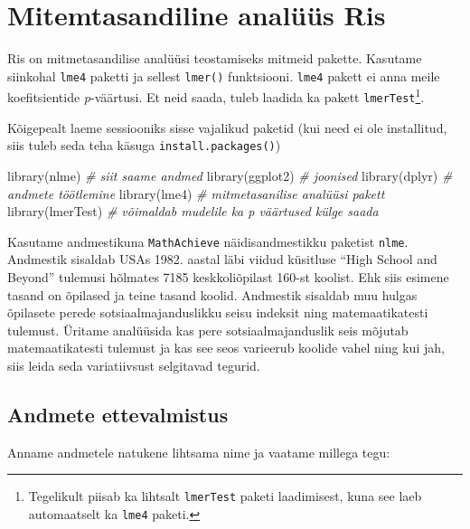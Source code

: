 \documentclass[
]{book}
\newenvironment{Shaded}{\begin{snugshade}}{\end{snugshade}}
\newcommand{\CommentTok}[1]{\textcolor[rgb]{0.56,0.35,0.01}{\textit{#1}}}
\newcommand{\FunctionTok}[1]{\textcolor[rgb]{0.00,0.00,0.00}{#1}}
\newcommand{\NormalTok}[1]{#1}
\begin{document}
\hypertarget{mitemtasandiline-analuxfcuxfcs-ris}{%
\section{Mitemtasandiline analüüs Ris}\label{mitemtasandiline-analuxfcuxfcs-ris}}

Ris on mitmetasandilise analüüsi teostamiseks mitmeid pakette. Kasutame siinkohal \texttt{lme4} paketti ja sellest \texttt{lmer()} funktsiooni. \texttt{lme4} pakett ei anna meile koefitsientide \emph{p}-väärtusi. Et neid saada, tuleb laadida ka pakett \texttt{lmerTest}\footnote{Tegelikult piisab ka lihtsalt \texttt{lmerTest} paketi laadimisest, kuna see laeb automaatselt ka \texttt{lme4} paketi.}.

Kõigepealt laeme sessiooniks sisse vajalikud paketid (kui need ei ole installitud, siis tuleb seda teha käsuga \texttt{install.packages()})

\begin{Shaded}
\begin{Highlighting}[]
\FunctionTok{library}\NormalTok{(nlme) }\CommentTok{\# siit saame andmed}
\FunctionTok{library}\NormalTok{(ggplot2) }\CommentTok{\# joonised}
\FunctionTok{library}\NormalTok{(dplyr) }\CommentTok{\# andmete töötlemine}
\FunctionTok{library}\NormalTok{(lme4) }\CommentTok{\# mitmetasanilise analüüsi pakett}
\FunctionTok{library}\NormalTok{(lmerTest) }\CommentTok{\# võimaldab mudelile ka p väärtused külge saada}
\end{Highlighting}
\end{Shaded}

Kasutame andmestikuna \texttt{MathAchieve} näidisandmestikku paketist \texttt{nlme}. Andmestik sisaldab USAs 1982. aastal läbi viidud küsitluse ``High School and Beyond'' tulemusi hõlmates 7185 keskkoliõpilast 160-st koolist. Ehk siis esimene tasand on õpilased ja teine tasand koolid. Andmestik sisaldab muu hulgas õpilasete perede sotsiaalmajanduslikku seisu indeksit ning matemaatikatesti tulemust.
Üritame analüüsida kas pere sotsiaalmajanduslik seis mõjutab matemaatikatesti tulemust ja kas see seos varieerub koolide vahel ning kui jah, siis leida seda variatiivsust selgitavad tegurid.

\hypertarget{andmete-ettevalmistus}{%
\subsection{Andmete ettevalmistus}\label{andmete-ettevalmistus}}

Anname andmetele natukene lihtsama nime ja vaatame millega tegu:
\end{document}
